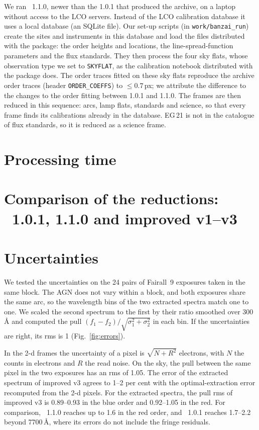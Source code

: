 We ran \banzai{}~1.1.0, newer than the 1.0.1 that produced the archive, on a laptop without access to the LCO
servers. Instead of the LCO calibration database it uses a local database (an SQLite file). Our set-up scripts (in
\texttt{work/banzai\_run}) create the sites and instruments in this database and load the files distributed with the
package: the order heights and locations, the line-spread-function parameters and the flux standards. They then
process the four sky flats, whose observation type we set to \texttt{SKYFLAT}, as the calibration notebook distributed
with the package does. The order traces fitted on these sky flats reproduce the archive order traces (header
\texttt{ORDER\_COEFFS}) to $\leq0.7$\,px; we attribute the difference to the changes to the order fitting between 1.0.1
and 1.1.0. The frames are then reduced in this sequence: arcs, lamp flats, standards and science, so that every frame
finds its calibrations already in the database. EG\,21 is not in the catalogue of flux standards, so it is reduced as
a science frame.

\section{Processing time}
\label{sec:raw_time}




\section{Comparison of the reductions: \banzai{}~1.0.1, 1.1.0 and improved v1--v3}
\label{sec:raw_compare}


\section{Uncertainties}
\label{sec:raw_errors}
We tested the uncertainties on the 24 pairs of Fairall~9 exposures taken in the same block. The AGN does not vary
within a block, and both exposures share the same arc, so the wavelength bins of the two extracted spectra match one
to one. We scaled the second spectrum to the first by their ratio smoothed over 300\,\AA{} and computed the pull
$(f_1-f_2)/\sqrt{\sigma_1^2+\sigma_2^2}$ in each bin. If the uncertainties are right, its rms is 1
(Fig.~\ref{fig:errors}).

In the 2-d frames the uncertainty of a pixel is $\sqrt{N+R^2}$ electrons, with $N$ the counts in electrons and $R$ the
read noise. On the sky, the pull between the same pixel in the two exposures has an rms of 1.05. The error of the
extracted spectrum of improved v3 agrees to 1--2 per cent with the optimal-extraction error \citep{Horne1986}
recomputed from the 2-d pixels. For the extracted spectra, the pull rms of improved v3 is 0.89--0.93 in the blue order
and 0.92--1.05 in the red. For comparison, \banzai{}~1.1.0 reaches up to 1.6 in the red order, and \banzai{}~1.0.1
reaches 1.7--2.2 beyond 7700\,\AA, where its errors do not include the fringe residuals.

